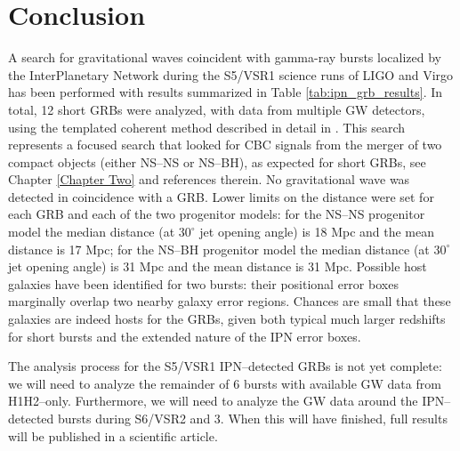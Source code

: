 \section{Conclusion}
\label{sec:conclusion}

A search for gravitational waves coincident with gamma-ray bursts localized by the InterPlanetary Network during the S5/VSR1 science runs of LIGO and Virgo has been performed with results summarized in Table \ref{tab:ipn_grb_results}. In total, 12 short GRBs were analyzed, with data from multiple GW detectors, using the templated coherent method described in detail in \cite{Harry:2010fr}. This search represents a focused search that looked for CBC signals from the merger of two compact objects (either NS--NS or NS--BH), as expected for short GRBs, see Chapter \ref{Chapter Two} and references therein. No gravitational wave was detected in coincidence with a GRB.  Lower limits on the distance were set for each GRB and each of the two progenitor models: for the NS--NS progenitor model the median distance (at $30^\circ$ jet opening angle) is 18 Mpc and the mean distance is 17 Mpc; for the NS--BH progenitor model the median distance (at $30^\circ$ jet opening angle) is 31 Mpc and the mean distance is 31 Mpc. Possible host galaxies have been identified for two bursts: their positional error boxes marginally overlap two nearby galaxy error regions. Chances are small that these galaxies are indeed hosts for the GRBs, given both typical much larger redshifts for short bursts and the extended nature of the IPN error boxes.

The analysis process for the S5/VSR1 IPN--detected GRBs is not yet complete: we will need to analyze the remainder of 6 bursts with available GW data from H1H2--only. Furthermore, we will need to analyze the GW data around the IPN--detected bursts during S6/VSR2 and 3. When this will have finished, full results will be published in a scientific article.

\vspace{25mm}

